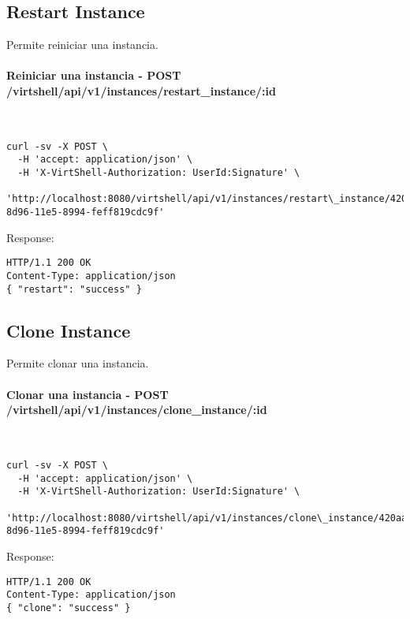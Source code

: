 \subsection{Restart Instance}

Permite reiniciar una instancia.

\paragraph{Reiniciar una instancia - POST /virtshell/api/v1/instances/restart\_instance/:id} ~\\

\begin{lstlisting}[style=json]
curl -sv -X POST \
  -H 'accept: application/json' \
  -H 'X-VirtShell-Authorization: UserId:Signature' \
   'http://localhost:8080/virtshell/api/v1/instances/restart\_instance/420aa3f0-8d96-11e5-8994-feff819cdc9f'
\end{lstlisting}

Response:

\begin{lstlisting}[style=json]
HTTP/1.1 200 OK
Content-Type: application/json
{ "restart": "success" }
\end{lstlisting}


\subsection{Clone Instance}

Permite clonar una instancia.

\paragraph{Clonar una instancia - POST /virtshell/api/v1/instances/clone\_instance/:id} ~\\

\begin{lstlisting}[style=json]
curl -sv -X POST \
  -H 'accept: application/json' \
  -H 'X-VirtShell-Authorization: UserId:Signature' \
   'http://localhost:8080/virtshell/api/v1/instances/clone\_instance/420aa3f0-8d96-11e5-8994-feff819cdc9f'
\end{lstlisting}

Response:

\begin{lstlisting}[style=json]
HTTP/1.1 200 OK
Content-Type: application/json
{ "clone": "success" }
\end{lstlisting}